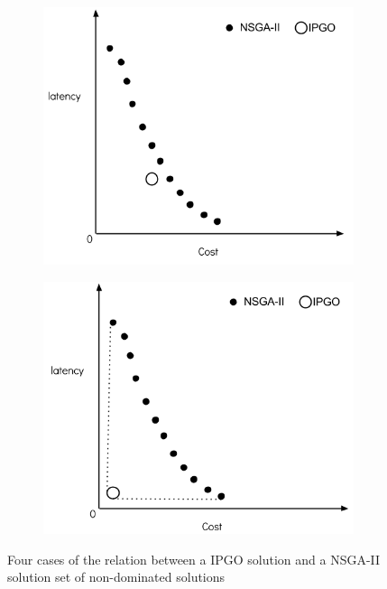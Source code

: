 \documentclass{llncs}
\begin{document}
\begin{figure}[H]
	\begin{subfigure}[b]{0.49\textwidth}
		\includegraphics[width=\textwidth]{pics/3.png}
		\caption{}
	\end{subfigure}
	\begin{subfigure}[b]{0.49\textwidth}
		\includegraphics[width=\textwidth]{pics/4.png}
		\caption{}
	\end{subfigure}
	\caption{Four cases of the relation between a IPGO solution and a NSGA-II solution set of non-dominated solutions}
\label{fig:Pareto}
\end{figure}
\end{document}

